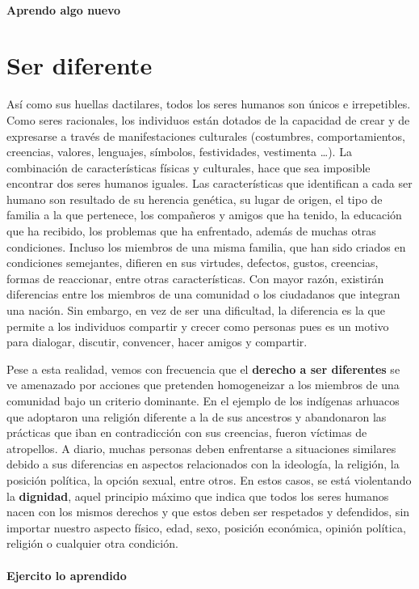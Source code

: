 \documentclass[10pt,twoside]{article}
\begin{document}
\paragraph*{Aprendo algo nuevo}
\section*{Ser diferente}
Así como sus huellas dactilares, todos los seres humanos son únicos e irrepetibles. Como seres racionales, los individuos están dotados de la capacidad de crear y de expresarse a través de manifestaciones culturales (costumbres, comportamientos, creencias, valores, lenguajes, símbolos, festividades, vestimenta \ldots). La combinación de características físicas y culturales, hace que sea imposible encontrar dos seres humanos iguales. Las características que identifican a cada ser humano son resultado de su herencia genética, su lugar de origen, el
tipo de familia a la que pertenece, los compañeros y amigos que ha tenido, la educación que ha recibido, los problemas que ha enfrentado, además de muchas otras condiciones. Incluso los miembros de una misma familia, que han sido criados en condiciones semejantes, difieren en sus virtudes, defectos, gustos, creencias, formas de reaccionar, entre
otras características. Con mayor razón, existirán diferencias entre los miembros de una comunidad o los ciudadanos que integran una nación. Sin embargo, en vez de ser una dificultad, la diferencia es la que permite a los individuos compartir y crecer como personas pues es un motivo para
dialogar, discutir, convencer, hacer amigos y compartir.

Pese a esta realidad, vemos con frecuencia que el \textbf{derecho a ser diferentes} se ve amenazado por acciones que pretenden homogeneizar a los miembros de una comunidad bajo un criterio dominante. En el ejemplo de los indígenas arhuacos que adoptaron una religión diferente a la de sus ancestros y abandonaron las prácticas que iban en contradicción con sus creencias, fueron víctimas de atropellos. A diario, muchas personas deben enfrentarse a situaciones similares debido a sus diferencias en
aspectos relacionados con la ideología, la religión, la posición
política, la opción sexual, entre otros. En estos casos, se está
violentando la \textbf{dignidad}, aquel principio máximo que indica que todos los seres humanos nacen con los mismos derechos y que estos deben ser respetados y defendidos, sin importar nuestro aspecto físico, edad, sexo, posición económica, opinión política, religión o cualquier otra condición.
\paragraph*{Ejercito lo aprendido}\\
\end{document}
